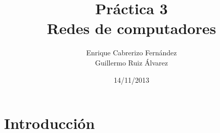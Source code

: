 \documentclass[a4]{article}
\title{Práctica 3\\Redes de computadores}
\author{Enrique Cabrerizo Fernández\\Guillermo Ruiz Álvarez}
\date{14/11/2013}
\begin{document}
\maketitle
\newpage
\tableofcontents
\newpage

\section{Introducción}
\end{document}
